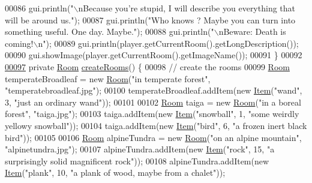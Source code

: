 \begin{DoxyCode}
00086         gui.println(\textcolor{stringliteral}{"\(\backslash\)nBecause you're stupid, I will describe you everything that will be around us."});
00087         gui.println(\textcolor{stringliteral}{"Who knows ? Maybe you can turn into something useful. One day. Maybe."});
00088         gui.println(\textcolor{stringliteral}{"\(\backslash\)nBeware: Death is coming!\(\backslash\)n"});
00089         gui.println(player.getCurrentRoom().getLongDescription());
00090         gui.showImage(player.getCurrentRoom().getImageName());
00091     \}
00092 
\hypertarget{GameEngine_8java_source_l00097}{}\hyperlink{classGameEngine_a9410d92f7d0e6820059b1d07da364b09}{00097}     \textcolor{keyword}{private} \hyperlink{classpkg__world_1_1Room}{Room} \hyperlink{classGameEngine_a9410d92f7d0e6820059b1d07da364b09}{createRooms}() \{
00098         \textcolor{comment}{// create the rooms}
00099         \hyperlink{classpkg__world_1_1Room}{Room} temperateBroadleaf = \textcolor{keyword}{new} \hyperlink{classpkg__world_1_1Room}{Room}(\textcolor{stringliteral}{"in temperate forest"}, \textcolor{stringliteral}{"temperatebroadleaf.jpg"});
00100         temperateBroadleaf.addItem(\textcolor{keyword}{new} \hyperlink{classpkg__world_1_1Item}{Item}(\textcolor{stringliteral}{"wand"}, 3, \textcolor{stringliteral}{"just an ordinary wand"}));
00101 
00102         \hyperlink{classpkg__world_1_1Room}{Room} taiga = \textcolor{keyword}{new} \hyperlink{classpkg__world_1_1Room}{Room}(\textcolor{stringliteral}{"in a boreal forest"}, \textcolor{stringliteral}{"taiga.jpg"});
00103         taiga.addItem(\textcolor{keyword}{new} \hyperlink{classpkg__world_1_1Item}{Item}(\textcolor{stringliteral}{"snowball"}, 1, \textcolor{stringliteral}{"some weirdly yellowy snowball"}));
00104         taiga.addItem(\textcolor{keyword}{new} \hyperlink{classpkg__world_1_1Item}{Item}(\textcolor{stringliteral}{"bird"}, 6, \textcolor{stringliteral}{"a frozen inert black bird"}));
00105 
00106         \hyperlink{classpkg__world_1_1Room}{Room} alpineTundra = \textcolor{keyword}{new} \hyperlink{classpkg__world_1_1Room}{Room}(\textcolor{stringliteral}{"on an alpine mountain"}, \textcolor{stringliteral}{"alpinetundra.jpg"});
00107         alpineTundra.addItem(\textcolor{keyword}{new} \hyperlink{classpkg__world_1_1Item}{Item}(\textcolor{stringliteral}{"rock"}, 15, \textcolor{stringliteral}{"a surprisingly solid magnificent rock"}));
00108         alpineTundra.addItem(\textcolor{keyword}{new} \hyperlink{classpkg__world_1_1Item}{Item}(\textcolor{stringliteral}{"plank"}, 10, \textcolor{stringliteral}{"a plank of wood, maybe from a chalet"}));

\end{DoxyCode}
